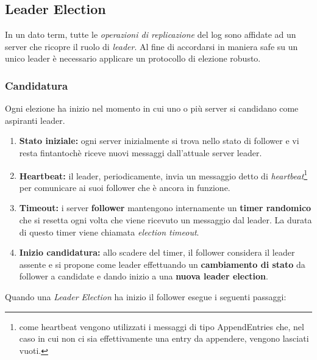 \subsection{Leader Election}
\label{Leader Election}
In un dato term, tutte le \textit{operazioni di replicazione} del log sono affidate ad un server che ricopre il ruolo di \textit{leader}. Al fine di accordarsi in maniera safe su un unico leader è necessario applicare un protocollo di elezione robusto.  

	\subsubsection{Candidatura}
	Ogni elezione ha inizio nel momento in cui uno o più server si candidano come aspiranti leader.

	\begin{enumerate}
		\item{\textbf{Stato iniziale:}}	ogni server inizialmente si trova nello stato di follower e vi resta fintantochè riceve nuovi messaggi dall'attuale server leader.
		\item{\textbf{Heartbeat:}} il leader, periodicamente, invia un messaggio detto di \textit{heartbeat}\footnote{come heartbeat vengono utilizzati i messaggi di tipo AppendEntries che, nel caso in cui non ci sia effettivamente una entry da appendere, vengono lasciati vuoti.} 
		per comunicare ai suoi follower che è ancora in funzione.
		\item{\textbf{Timeout:}} i server \textbf{follower} mantengono internamente un \textbf{timer randomico} che si resetta ogni volta che viene ricevuto un messaggio dal leader. La durata di questo timer viene chiamata \textit{election timeout}.		
		\item{\textbf{Inizio candidatura:}} allo scadere del timer, il follower considera il leader assente e si propone come leader effettuando un \textbf{cambiamento di stato} da follower a candidate e dando inizio a una \textbf{nuova leader election}.
	\end{enumerate}


Quando una \textit{Leader Election} ha inizio il follower esegue i seguenti passaggi:

